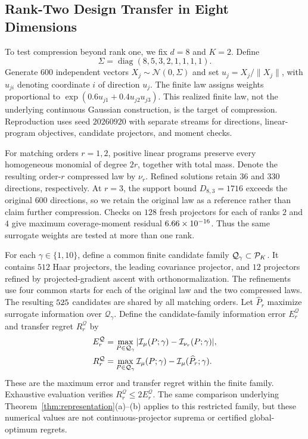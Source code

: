 \subsection{Rank-Two Design Transfer in Eight Dimensions}
To test compression beyond rank one, we fix $d=8$ and $K=2$. Define
\begin{equation}
\Sigma=\operatorname{diag}(8,5,3,2,1,1,1,1).
\end{equation}
Generate $600$ independent vectors $X_j\sim\mathcal N(0,\Sigma)$ and set $u_j=X_j/\|X_j\|$, with $u_{ji}$ denoting coordinate $i$ of direction $u_j$. The finite law assigns weights proportional to $\exp(0.6u_{j1}+0.4u_{j2}u_{j3})$. This realized finite law, not the underlying continuous Gaussian construction, is the target of compression. Reproduction uses seed $20260920$ with separate streams for directions, linear-program objectives, candidate projectors, and moment checks.

For matching orders $r=1,2$, positive linear programs preserve every homogeneous monomial of degree $2r$, together with total mass. Denote the resulting order-$r$ compressed law by $\nu_r$. Refined solutions retain $36$ and $330$ directions, respectively. At $r=3$, the support bound $D_{8,3}=1716$ exceeds the original $600$ directions, so we retain the original law as a reference rather than claim further compression. Checks on $128$ fresh projectors for each of ranks $2$ and $4$ give maximum coverage-moment residual $6.66\times10^{-16}$. Thus the same surrogate weights are tested at more than one rank.

For each $\gamma\in\{1,10\}$, define a common finite candidate family $\mathcal Q_\gamma\subset\mathcal P_K$. It contains $512$ Haar projectors, the leading covariance projector, and $12$ projectors refined by projected-gradient ascent with orthonormalization. The refinements use four common starts for each of the original law and the two compressed laws. The resulting $525$ candidates are shared by all matching orders. Let $\widehat P_r$ maximize surrogate information over $\mathcal Q_\gamma$. Define the candidate-family information error $E_r^{\mathcal Q}$ and transfer regret $R_r^{\mathcal Q}$ by
\begin{align}
E_r^{\mathcal Q}&=\max_{P\in\mathcal Q_\gamma}|\mathcal I_\mu(P;\gamma)-\mathcal I_{\nu_r}(P;\gamma)|,\\
R_r^{\mathcal Q}&=\max_{P\in\mathcal Q_\gamma}\mathcal I_\mu(P;\gamma)-\mathcal I_\mu(\widehat P_r;\gamma).
\end{align}
These are the maximum error and transfer regret within the finite family. Exhaustive evaluation verifies $R_r^{\mathcal Q}\le2E_r^{\mathcal Q}$. The same comparison underlying Theorem~\ref{thm:representation}(a)--(b) applies to this restricted family, but these numerical values are not continuous-projector suprema or certified global-optimum regrets.


